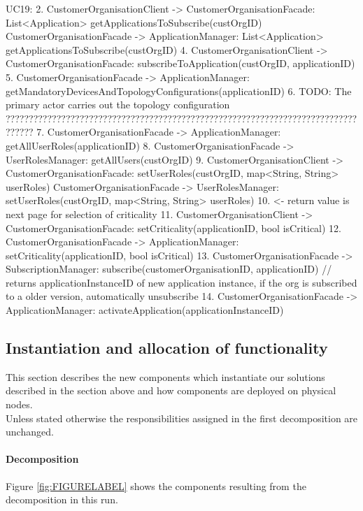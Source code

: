         UC19:
            2. CustomerOrganisationClient -> CustomerOrganisationFacade: List<Application> getApplicationsToSubscribe(custOrgID)
                   CustomerOrganisationFacade -> ApplicationManager: List<Application> getApplicationsToSubscribe(custOrgID)
            4. CustomerOrganisationClient -> CustomerOrganisationFacade: subscribeToApplication(custOrgID, applicationID)
            5. CustomerOrganisationFacade -> ApplicationManager: getMandatoryDevicesAndTopologyConfigurations(applicationID)
            6. TODO: The primary actor carries out the topology configuration ??????????????????????????????????????????????????????????????????????????????????
            7. CustomerOrganisationFacade -> ApplicationManager: getAllUserRoles(applicationID)
            8. CustomerOrganisationFacade -> UserRolesManager: getAllUsers(custOrgID)
            9. CustomerOrganisationClient -> CustomerOrganisationFacade: setUserRoles(custOrgID, map<String, String> userRoles)
                   CustomerOrganisationFacade -> UserRolesManager: setUserRoles(custOrgID, map<String, String> userRoles)
                   10. <- return value is next page for selection of criticality
            11. CustomerOrganisationClient -> CustomerOrganisationFacade: setCriticality(applicationID, bool isCritical)
                    12. CustomerOrganisationFacade -> ApplicationManager: setCriticality(applicationID, bool isCritical)
            13. CustomerOrganisationFacade -> SubscriptionManager: subscribe(customerOrganisationID, applicationID) // returns applicationInstanceID of new application instance, if the org is subscribed to a older version, automatically unsubscribe
            14. CustomerOrganisationFacade -> ApplicationManager: activateApplication(applicationInstanceID)


\subsection{Instantiation and allocation of functionality}
    This section describes the new components which instantiate our solutions described
    in the section above and how components are deployed on physical nodes. \\
    Unless stated otherwise the responsibilities assigned in the first decomposition are unchanged.

    \paragraph{Decomposition}
        Figure \ref{fig:FIGURELABEL} shows the components resulting from the
        decomposition in this run.

